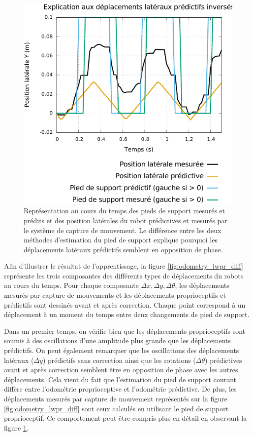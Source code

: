 \begin{figure}[htbp]
    \centerfloat
    \includegraphics[type=pdf,ext=.pdf,read=.pdf,width=0.6\linewidth]{../plot/OdometryLWPR/grass_open_why_goal_lateral_diff}
    \caption{\label{fig:odometry_lwpr_why_goal_lateral_diff} 
        Représentation au cours du temps des pieds de support mesurés et prédits 
        et des position latérales du robot prédictives et mesurés par le système de capture de mouvement.
        Le différence entre les deux méthodes d'estimation du pied de support
        explique pourquoi les déplacements latéraux prédictifs semblent en opposition de phase.
    }
\end{figure}

Afin d'illustrer le résultat de l'apprentissage, la figure \ref{fig:odometry_lwpr_diff}
représente les trois composantes des différents types de déplacements du robots au cours du temps.
Pour chaque composante $\Delta x, \Delta y, \Delta \theta$, les déplacements mesurés par 
capture de mouvements et les déplacements proprioceptifs et prédictifs sont dessinés
avant et après correction.
Chaque point correspond à un déplacement à un moment du temps entre deux changements de pied de support.

Dans un premier temps, on vérifie bien que les déplacements proprioceptifs sont 
soumis à des oscillations d'une amplitude plus grande que les déplacements prédictifs.
On peut également remarquer que les oscillations des déplacements latéraux ($\Delta y$) 
prédictifs sans correction ainsi que les rotations ($\Delta \theta$) prédictives 
avant et après correction
semblent être en opposition de phase avec les autres déplacements.
Cela vient du fait que l'estimation du pied de support courant diffère entre 
l'odométrie proprioceptive et l'odométrie prédictive. 
De plus, les déplacements mesurés par capture de mouvement représentés sur 
la figure \ref{fig:odometry_lwpr_diff} sont ceux calculés en utilisant le pied de support
proprioceptif.
Ce comportement peut être compris plus en détail en observant 
la figure \ref{fig:odometry_lwpr_why_goal_lateral_diff}.

